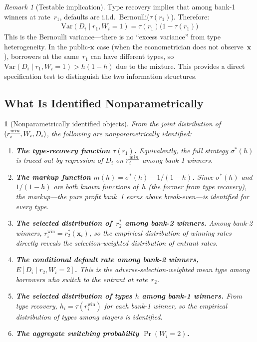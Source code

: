 \documentclass[12pt]{article}
\theoremstyle{plain}
\theoremstyle{plain}
\newtheorem{prop}[thm]{\protect\propositionname}
\theoremstyle{definition}
\theoremstyle{remark}
\newtheorem{remark}[thm]{Remark}
\providecommand{\propositionname}{Proposition}
\begin{document}
\begin{remark}[Testable implication]\label{rem:testable}
Type recovery implies that among bank-1 winners at rate~$r_1$, defaults are i.i.d.\ Bernoulli($\tau(r_1)$).  Therefore:
\begin{align}\label{eq:variance_test}
    \text{Var}(D_i \mid r_1, W_i = 1) = \tau(r_1)\big(1 - \tau(r_1)\big)
\end{align}
This is the Bernoulli variance---there is no ``excess variance'' from type heterogeneity.  In the public-$\mathbf{x}$ case (when the econometrician does not observe~$\mathbf{x}$), borrowers at the same~$r_1$ can have different types, so $\text{Var}(D_i \mid r_1, W_i = 1) > h(1-h)$ due to the mixture.  This provides a direct specification test to distinguish the two information structures.
\end{remark}


\subsection{What Is Identified Nonparametrically}\label{sec:nonpar8}

\begin{prop}[Nonparametrically identified objects]\label{prop:nonpar8}
From the joint distribution of $(r_i^{\emph{win}}, W_i, D_i)$, the following are nonparametrically identified:
\begin{enumerate}
    \item[(a)] \textbf{The type-recovery function $\tau(r_1)$.}  Equivalently, the full strategy $\sigma^*(h)$ is traced out by regression of $D_i$ on $r_i^{\emph{win}}$ among bank-1 winners.

    \item[(b)] \textbf{The markup function $m(h) = \sigma^*(h) - 1/(1-h)$.}  Since $\sigma^*(h)$ and $1/(1-h)$ are both known functions of~$h$ (the former from type recovery), the markup---the pure profit bank~1 earns above break-even---is identified for every type.

    \item[(c)] \textbf{The selected distribution of~$r_2^*$ among bank-2 winners.}  Among bank-2 winners, $r_i^{\text{win}} = r_2^*(\mathbf{x}_i)$, so the empirical distribution of winning rates directly reveals the selection-weighted distribution of entrant rates.

    \item[(d)] \textbf{The conditional default rate among bank-2 winners, $E[D_i \mid r_2, W_i = 2]$.}  This is the adverse-selection-weighted mean type among borrowers who switch to the entrant at rate~$r_2$.

    \item[(e)] \textbf{The selected distribution of types $h$ among bank-1 winners.}  From type recovery, $h_i = \tau(r_i^{\text{win}})$ for each bank-1 winner, so the empirical distribution of types among stayers is identified.

    \item[(f)] \textbf{The aggregate switching probability $\Pr(W_i = 2)$.}
\end{enumerate}
\end{prop}
\end{document}
